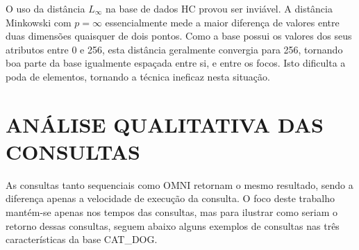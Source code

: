 O uso da distância $L_\infty$ na base de dados HC provou ser inviável. A distância Minkowski com $p = \infty$ essencialmente mede a 
maior diferença de valores entre duas dimensões quaisquer de dois pontos. Como a base possui os valores dos seus atributos entre 0 e 256, 
esta distância geralmente convergia para 256, tornando boa parte da base igualmente espaçada entre si, e entre os focos. Isto dificulta
a poda de elementos, tornando a técnica ineficaz nesta situação.

\section{ANÁLISE QUALITATIVA DAS CONSULTAS}

As consultas tanto sequenciais como OMNI retornam o mesmo resultado, sendo a diferença apenas a velocidade de execução da consulta. O foco deste trabalho
mantém-se apenas nos tempos das consultas, mas para ilustrar como seriam o retorno dessas consultas, seguem abaixo alguns exemplos
de consultas nas três características da base CAT\_DOG.


